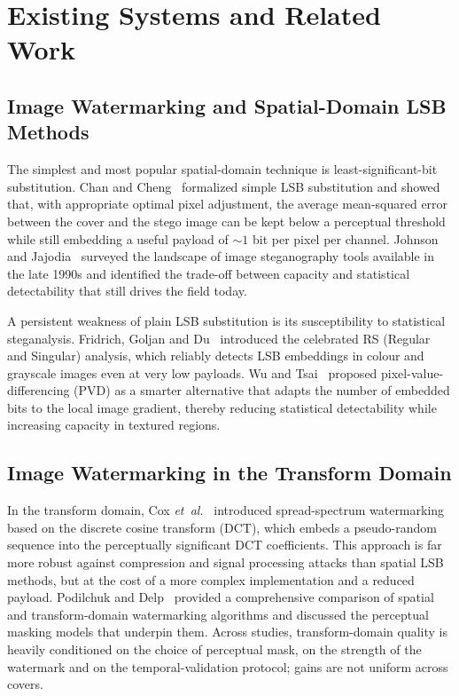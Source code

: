\section{Existing Systems and Related Work}

\subsection{Image Watermarking and Spatial-Domain LSB Methods}

The simplest and most popular spatial-domain technique is least-significant-bit substitution. Chan and Cheng~\cite{chan2004hiding} formalized simple LSB substitution and showed that, with appropriate optimal pixel adjustment, the average mean-squared error between the cover and the stego image can be kept below a perceptual threshold while still embedding a useful payload of $\sim 1$ bit per pixel per channel. Johnson and Jajodia~\cite{johnson1998exploring} surveyed the landscape of image steganography tools available in the late 1990s and identified the trade-off between capacity and statistical detectability that still drives the field today.

A persistent weakness of plain LSB substitution is its susceptibility to statistical steganalysis. Fridrich, Goljan and Du~\cite{fridrich2001detecting} introduced the celebrated RS (Regular and Singular) analysis, which reliably detects LSB embeddings in colour and grayscale images even at very low payloads. Wu and Tsai~\cite{wu2003steganography} proposed pixel-value-differencing (PVD) as a smarter alternative that adapts the number of embedded bits to the local image gradient, thereby reducing statistical detectability while increasing capacity in textured regions.

\subsection{Image Watermarking in the Transform Domain}

In the transform domain, Cox \emph{et~al.}~\cite{cox1997secure} introduced spread-spectrum watermarking based on the discrete cosine transform (DCT), which embeds a pseudo-random sequence into the perceptually significant DCT coefficients. This approach is far more robust against compression and signal processing attacks than spatial LSB methods, but at the cost of a more complex implementation and a reduced payload. Podilchuk and Delp~\cite{podilchuk2001digital} provided a comprehensive comparison of spatial and transform-domain watermarking algorithms and discussed the perceptual masking models that underpin them. Across studies, transform-domain quality is heavily conditioned on the choice of perceptual mask, on the strength of the watermark and on the temporal-validation protocol; gains are not uniform across covers.

